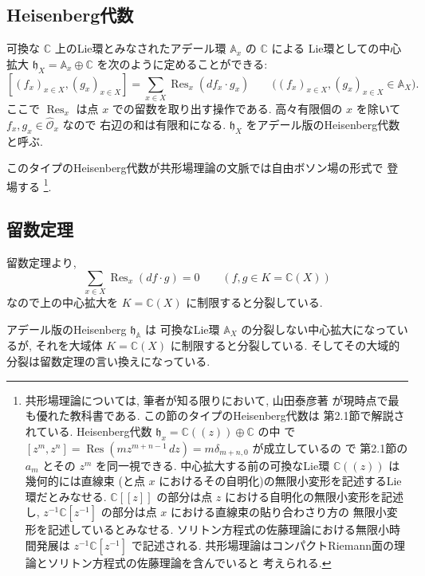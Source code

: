 \documentclass[12pt,twoside]{jarticle}
\newcommand\C{{\mathbb C}} %
\theoremstyle{definition} %
\theoremstyle{definition} %
\theoremstyle{definition} %
\numberwithin{theorem}{section}
\numberwithin{equation}{section}
\numberwithin{figure}{section}
\numberwithin{table}{section}
\newcommand\Res{\mathop{\mathrm{Res}}\nolimits}
\newcommand\h{{\mathfrak h}}
\newcommand\OO{{\mathcal O}}
\newcommand\Ohat{{\widehat \OO}}
\newcommand\A{{\mathbb A}}
\begin{document}

\subsection{Heisenberg代数}

可換な $\C$ 上のLie環とみなされたアデール環 $\A_x$ の $\C$ による
Lie環としての中心拡大 $\h_X=\A_x\oplus\C$ を次のように定めることができる:
\[
 [(f_x)_{x\in X}, (g_x)_{x\in X}] = \sum_{x\in X} \Res_x(df_x\cdot g_x)
 \qquad \bigl((f_x)_{x\in X}, (g_x)_{x\in X}\in\A_X\bigr).
\]
ここで $\Res_x$ は点 $x$ での留数を取り出す操作である.
高々有限個の $x$ を除いて $f_x,g_x\in\Ohat_x$ なので
右辺の和は有限和になる.
$\h_X$ をアデール版のHeisenberg代数と呼ぶ.

このタイプのHeisenberg代数が共形場理論の文脈では自由ボソン場の形式で
登場する%
\footnote{共形場理論については, 筆者が知る限りにおいて,
山田泰彦著 \cite{yamada} が現時点で最も優れた教科書である.
この節のタイプのHeisenberg代数は \cite{yamada} 第2.1節で解説されている.
Heisenberg代数 $\h_x=\C((z))\oplus\C$ の中
で $[z^m,z^n]=\Res(mz^{m+n-1}\,dz)=m\delta_{m+n,0}$ が成立しているの
で \cite{yamada} 第2.1節の $a_m$ とその $z^m$ を同一視できる.
中心拡大する前の可換なLie環 $\C((z))$ は幾何的には直線束
(と点 $x$ におけるその自明化)の無限小変形を記述するLie環だとみなせる.
$\C[[z]]$ の部分は点 $z$ における自明化の無限小変形を記述し,
$z^{-1}\C[z^{-1}]$ の部分は点 $x$ における直線束の貼り合わさり方の
無限小変形を記述しているとみなせる.
ソリトン方程式の佐藤理論における無限小時間発展は $z^{-1}\C[z^{-1}]$ で記述される.
共形場理論はコンパクトRiemann面の理論とソリトン方程式の佐藤理論を含んでいると
考えられる.
}.


\subsection{留数定理}

留数定理より,
\[
\sum_{x\in X} \Res_x(df\cdot g)=0 \qquad (f,g\in K=\C(X))
\]
なので上の中心拡大を $K=\C(X)$ に制限すると分裂している.

アデール版のHeisenberg $\h_\A$ は
可換なLie環 $\A_X$ の分裂しない中心拡大になっているが,
それを大域体 $K=\C(X)$ に制限すると分裂している.
そしてその大域的分裂は留数定理の言い換えになっている.
\end{document}
